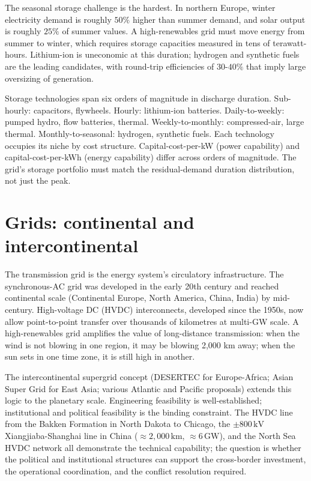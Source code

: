The seasonal storage challenge is the hardest. In northern Europe, winter electricity demand is roughly $50\%$ higher than summer demand, and solar output is roughly $25\%$ of summer values. A high-renewables grid must move energy from summer to winter, which requires storage capacities measured in tens of terawatt-hours. Lithium-ion is uneconomic at this duration; hydrogen and synthetic fuels are the leading candidates, with round-trip efficiencies of $30$-$40\%$ that imply large oversizing of generation.

\begin{archetype}
Storage technologies span six orders of magnitude in discharge duration. Sub-hourly: capacitors, flywheels. Hourly: lithium-ion batteries. Daily-to-weekly: pumped hydro, flow batteries, thermal. Weekly-to-monthly: compressed-air, large thermal. Monthly-to-seasonal: hydrogen, synthetic fuels. Each technology occupies its niche by cost structure. Capital-cost-per-kW (power capability) and capital-cost-per-kWh (energy capability) differ across orders of magnitude. The grid's storage portfolio must match the residual-demand duration distribution, not just the peak.
\end{archetype}

\section{Grids: continental and intercontinental}

The transmission grid is the energy system's circulatory infrastructure. The synchronous-AC grid was developed in the early 20th century and reached continental scale (Continental Europe, North America, China, India) by mid-century. High-voltage DC (HVDC) interconnects, developed since the 1950s, now allow point-to-point transfer over thousands of kilometres at multi-GW scale. A high-renewables grid amplifies the value of long-distance transmission: when the wind is not blowing in one region, it may be blowing 2,000 km away; when the sun sets in one time zone, it is still high in another.

The intercontinental supergrid concept (DESERTEC for Europe-Africa; Asian Super Grid for East Asia; various Atlantic and Pacific proposals) extends this logic to the planetary scale. Engineering feasibility is well-established; institutional and political feasibility is the binding constraint. The HVDC line from the Bakken Formation in North Dakota to Chicago, the $\pm 800\,\text{kV}$ Xiangjiaba-Shanghai line in China ($\approx 2{,}000\,\text{km}$, $\approx 6\,\text{GW}$), and the North Sea HVDC network all demonstrate the technical capability; the question is whether the political and institutional structures can support the cross-border investment, the operational coordination, and the conflict resolution required.

